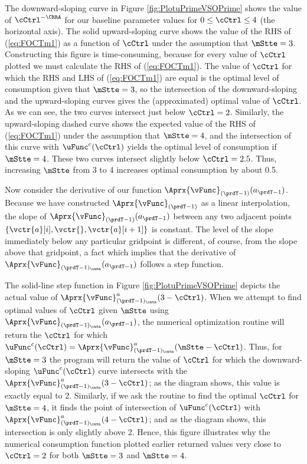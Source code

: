 \documentclass[\econtexRoot/SolvingMicroDSOPs]{subfiles}
\begin{document}
The downward-sloping curve in Figure \ref{fig:PlotuPrimeVSOPrime}
shows the value of $\cCtrl^{-\CRRA}$ for our baseline parameter values
for $0 \leq \cCtrl \leq 4$ (the horizontal axis).  The solid
upward-sloping curve shows the value of the RHS of (\ref{eq:FOCTm1})
as a function of $\cCtrl$ under the assumption that $\mStte=3$.
Constructing this figure is time-consuming, because for every
value of $\cCtrl$ plotted we must calculate the RHS of
(\ref{eq:FOCTm1}).  The value of $\cCtrl$ for which the RHS and LHS
of (\ref{eq:FOCTm1}) are equal is the optimal level of consumption
given that $\mStte=3$, so the intersection of the downward-sloping
and the upward-sloping curves gives the (approximated) optimal value of $\cCtrl$.
As we can see, the two curves intersect just below $\cCtrl=2$.
Similarly, the upward-sloping dashed curve shows the expected value
of the RHS of (\ref{eq:FOCTm1}) under the assumption that $\mStte=4$,
and the intersection of this curve with $\uFunc^{c}(\cCtrl)$ yields the
optimal level of consumption if $\mStte=4$.  These two curves
intersect slightly below $\cCtrl=2.5$.  Thus, increasing $\mStte$
from 3 to 4 increases optimal consumption by about 0.5.

 Now consider the derivative of our function
$\Aprx{\vFunc}_{({\prdT-1})}(a_{\prdT-1})$.  Because we have constructed
$\Aprx{\vFunc}_{({\prdT-1})}$ as a linear interpolation, the slope of
$\Aprx{\vFunc}_{({\prdT-1})}(a_{\prdT-1})$ between any two adjacent
points $\{\vctr{a}[i],\vctr{},\vctr{a}[{i+1}]\}$ is constant.  The
level of the slope immediately below any particular gridpoint is
different, of course, from the slope above that gridpoint, a fact
which implies that the derivative of
$\Aprx{\vFunc}_{({\prdT-1})_\cntn}(a_{\prdT-1})$ follows a step function.

The solid-line step function in Figure \ref{fig:PlotuPrimeVSOPrime}
depicts the actual value of
$\Aprx{\vFunc}_{({\prdT-1})_\cntn}^{a}(3-\cCtrl)$.  When we attempt to find
optimal values of $\cCtrl$ given $\mStte$ using
$\Aprx{\vFunc}_{({\prdT-1})_\cntn}(a_{\prdT-1})$, the numerical optimization
routine will return the $\cCtrl$ for which $\uFunc^{c}(\cCtrl) =
\Aprx{\vFunc}^{a}_{({\prdT-1})_\cntn}(\mStte-\cCtrl)$.  Thus, for
$\mStte=3$ the program will return the value of $\cCtrl$ for
which the downward-sloping $\uFunc^{c}(\cCtrl)$ curve intersects with the
$\Aprx{\vFunc}_{({\prdT-1})_\cntn}^{a}(3-\cCtrl)$; as the diagram shows,
this value is exactly equal to 2.  Similarly, if we ask the routine
to find the optimal $\cCtrl$ for $\mStte=4$, it finds the point
of intersection of $\uFunc^{c}(\cCtrl)$ with
$\Aprx{\vFunc}_{({\prdT-1})_\cntn}^{a}(4-\cCtrl)$; and as the diagram shows,
this intersection is only slightly above 2.  Hence, this figure
illustrates why the numerical consumption function plotted earlier
returned values very close to $\cCtrl=2$ for both $\mStte=3$ and
$\mStte=4$.
\end{document}
